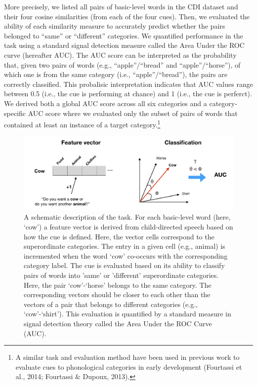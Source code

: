 \documentclass[english,,man]{apa6}
\let\rmarkdownfootnote\footnote%
\def\footnote{\protect\rmarkdownfootnote}
\begin{document}
More precisely, we listed all pairs of basic-level words in the CDI dataset and their four cosine similarities (from each of the four cues). Then, we evaluated the ability of each similarity measure to accurately predict whether the pairs belonged to \enquote{same} or \enquote{different} categories. We quantified performance in the task using a standard signal detection measure called the Area Under the ROC curve (hereafter AUC). The AUC score can be interpreted as the probability that, given two pairs of words (e.g., \enquote{apple}/\enquote{bread} and \enquote{apple}/\enquote{horse}), of which one is from the same category (i.e., \enquote{apple}/\enquote{bread}), the pairs are correctly classified. This probalisic interpretation indicates that AUC values range between 0.5 (i.e., the cue is performing at chance) and 1 (i.e., the cue is perferct). We derived both a global AUC score across all six categories and a category-specific AUC score where we evaluated only the subset of pairs of words that contained at least an instance of a target category.\footnote{A similar task and evaluation method have been used in previous work to evaluate cues to phonological categories in early development (Fourtassi et al., 2014; Fourtassi \& Dupoux, 2013).}

\begin{figure}[h]

{\centering \includegraphics{child_language_journal_files/figure-latex/task-1} 

}

\caption{\label{fig:task} A schematic description of the task. For each basic-level word (here, `cow') a feature vector is derived from child-directed speech based on how the cue is defined. Here, the vector cells correspond to the superordinate categories. The entry in a given cell (e.g., animal) is incremented when the word `cow' co-occurs with the corresponding category label. The cue is evaluated based on its ability to classify pairs of words into 'same' or 'different' superordinate categories. Here, the pair `cow'-`horse' belongs to the same category. The corresponding vectors should be closer to each other than the vectors of a pair that belongs to different categories (e.g., `cow'-`shirt'). This evaluation is quantified by a standard measure in signal detection theory called the Area Under the ROC Curve (AUC).}\label{fig:task}
\end{figure}
\end{document}
